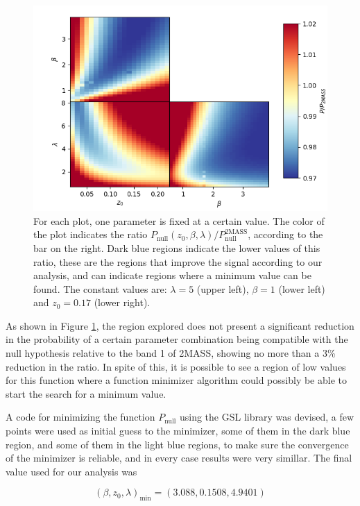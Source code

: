 \documentclass[openany,a4paper,12pt,oneside]{book}
\begin{document}
\begin{spacing}{1.5}
\begin{figure}[!htb]
	\centering
	\includegraphics[width=.92\linewidth]{Imagens/triple_colorplot.png}
	\caption{For each plot, one parameter is fixed at a certain value. The color of the plot indicates the ratio $P_\text{null}(z_0, \beta,\lambda)/P_\text{null}^\text{2MASS}$, according to the bar on the right. Dark blue regions indicate the lower values of this ratio, these are the regions that improve the signal according to our analysis, and can indicate regions where a minimum value can be found. The constant values are: $\lambda=5$ (upper left), $\beta=1$ (lower left) and $z_0=0.17$ (lower right).}
	\label{fig:Triple_ColorPlots}
\end{figure}

As shown in Figure \ref{fig:Triple_ColorPlots}, the region explored does not present a significant reduction in the probability of a certain parameter combination being compatible with the null hypothesis relative to the band 1 of 2MASS, showing no more than a 3\% reduction in the ratio. In spite of this, it is possible to see a region of low values for this function where a function minimizer algorithm could possibly be able to start the search for a minimum value.

A code for minimizing the function $P_\text{null}$ using the GSL library\cite{gsl-manual} was devised, a few points were used as initial guess to the minimizer, some of them in the dark blue region, and some of them in the light blue regions, to make sure the convergence of the minimizer is reliable, and in every case results were very simillar. The final value used for our analysis was

\begin{equation}\label{minimizer}
	(\beta, z_0, \lambda)_\text{min}=(3.088, 0.1508, 4.9401)
\end{equation}


\end{spacing}
\end{document}
